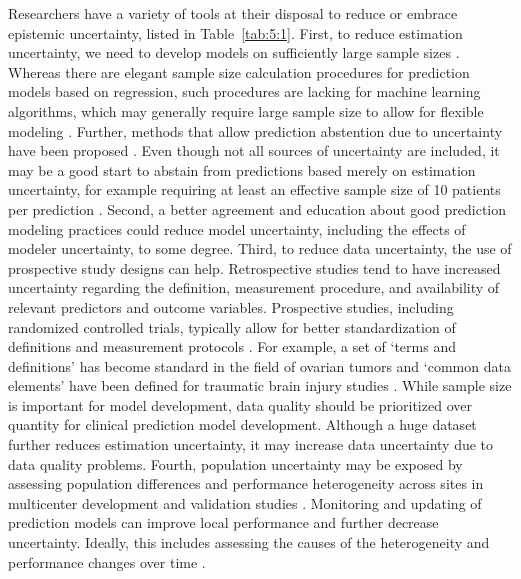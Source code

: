 Researchers have a variety of tools at their disposal to reduce or embrace epistemic uncertainty, listed in Table~\ref{tab:5:1}. First, to reduce estimation uncertainty, we need to develop models on sufficiently large sample sizes \cite{tsegayeLargerSampleSizes2025}. Whereas there are elegant sample size calculation procedures for prediction models based on regression, such procedures are lacking for machine learning algorithms, which may generally require large sample size to allow for flexible modeling \cite{rileyCalculatingSampleSize2020,vanderploegModernModellingTechniques2014}. Further, methods that allow prediction abstention due to uncertainty have been proposed \cite{kompaSecondOpinionNeeded2021,myersIdentifyingUnreliablePredictions2020}. Even though not all sources of uncertainty are included, it may be a good start to abstain from predictions based merely on estimation uncertainty, for example requiring at least an effective sample size of 10 patients per prediction \cite{rileyUncertaintyRiskEstimates2025,thomassenEffectiveSampleSize2024}. Second, a better agreement and education about good prediction modeling practices could reduce model uncertainty, including the effects of modeler uncertainty, to some degree. Third, to reduce data uncertainty, the use of prospective study designs can help. Retrospective studies tend to have increased uncertainty regarding the definition, measurement procedure, and availability of relevant predictors and outcome variables. Prospective studies, including randomized controlled trials, typically allow for better standardization of definitions and measurement protocols \cite{steyerbergPrognosisResearchStrategy2013}. For example, a set of `terms and definitions' has become standard in the field of ovarian tumors \cite{timmermanTermsDefinitionsMeasurements2000} and `common data elements' have been defined for traumatic brain injury studies \cite{maasOpportunitiesChallengesHighQuality2022,maasStandardizingDataCollection2011}. While sample size is important for model development, data quality should be prioritized over quantity for clinical prediction model development. Although a huge dataset further reduces estimation uncertainty, it may increase data uncertainty due to data quality problems. Fourth, population uncertainty may be exposed by assessing population differences and performance heterogeneity across sites in multicenter development and validation studies \cite{vancalsterThereNoSuch2023}. Monitoring and updating of prediction models can improve local performance and further decrease uncertainty. Ideally, this includes assessing the causes of the heterogeneity and performance changes over time \cite{youssefExternalValidationAI2023,swaminathanReflexiveRecalibrationCausal2025}.

